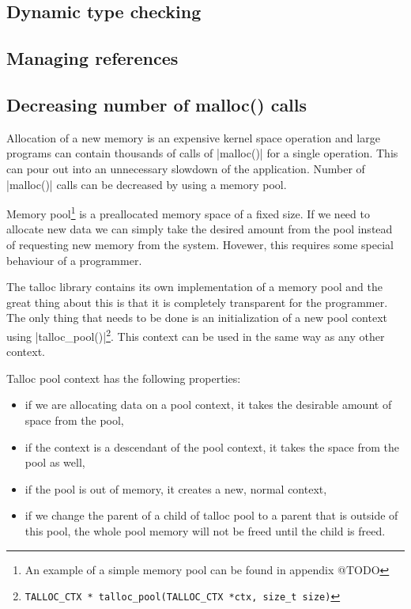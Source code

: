 \subsection{Dynamic type checking}
\label{talloc:subsec:type-checking}


\subsection{Managing references}
\label{talloc:subsec:references}

\subsection{Decreasing number of malloc() calls}
\label{talloc:subsec:pool}


Allocation of a new memory is an expensive kernel space operation and large
programs can contain thousands of calls of |malloc()| for a single operation.
This can pour out into an unnecessary slowdown of the application. Number of
|malloc()| calls can be decreased by using a memory pool.

Memory pool\footnote{An example of a simple memory pool can be found in appendix
@TODO} is a preallocated memory space of a fixed size. If we need to allocate
new data we can simply take the desired amount from the pool instead of
requesting new memory from the system. Hovewer, this requires some special
behaviour of a programmer.

The talloc library contains its own implementation of a memory pool and the
great thing about this is that it is completely transparent for the programmer.
The only thing that needs to be done is an initialization of a new pool context
using |talloc_pool()|\footnote{\lstinline{TALLOC_CTX *
talloc_pool(TALLOC_CTX *ctx, size_t size)}}. This context can be used in the
same way as any other context.

Talloc pool context has the following properties:

\begin{itemize}
  \item if we are allocating data on a pool context, it takes the  desirable
  amount of space from the pool,
  \item if the context is a descendant of the pool context, it takes the space
  from the pool as well,
  \item if the pool is out of memory, it creates a new, normal context,
  \item if we change the parent of a child of talloc pool to a parent that is
  outside of this pool, the whole pool memory will not be freed until the child
  is freed.
\end{itemize}

